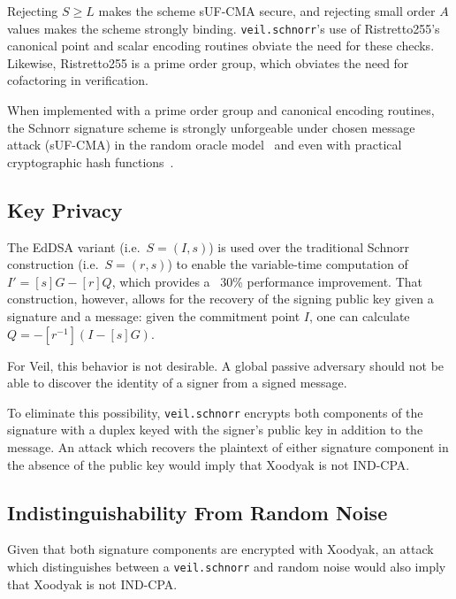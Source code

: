 Rejecting $S \geq L$ makes the scheme sUF-CMA secure, and rejecting small order $A$ values makes the scheme strongly
binding.
\texttt{veil.schnorr}'s use of Ristretto255's canonical point and scalar encoding routines obviate the need for these
checks.
Likewise, Ristretto255 is a prime order group, which obviates the need for cofactoring in verification.

When implemented with a prime order group and canonical encoding routines, the Schnorr signature scheme is strongly
unforgeable under chosen message attack (sUF-CMA) in the random oracle model~\cite{pointcheval2000} and even with
practical cryptographic hash functions~\cite{neven2009}.

\subsection{Key Privacy}\label{subsec:veil.schnorr-key-privacy}

The EdDSA variant (i.e.\ $S=(I,s)$) is used over the traditional Schnorr construction (i.e.\ $S=(r,s)$) to enable the
variable-time computation of $I'=[s]G - [r]Q$, which provides a ~30\% performance improvement.
That construction, however, allows for the recovery of the signing public key given a signature and a message: given the
commitment point $I$, one can calculate $Q=-[r^{-1}](I - [s]G)$.

For Veil, this behavior is not desirable.
A global passive adversary should not be able to discover the identity of a signer from a signed message.

To eliminate this possibility, \texttt{veil.schnorr} encrypts both components of the signature with a duplex keyed with
the signer's public key in addition to the message.
An attack which recovers the plaintext of either signature component in the absence of the public key would imply that
Xoodyak is not IND-CPA\@.

\subsection{Indistinguishability From Random Noise}\label{subsec:veil.schnorr-indistinguishability}

Given that both signature components are encrypted with Xoodyak, an attack which distinguishes between a
\texttt{veil.schnorr} and random noise would also imply that Xoodyak is not IND-CPA\@.
